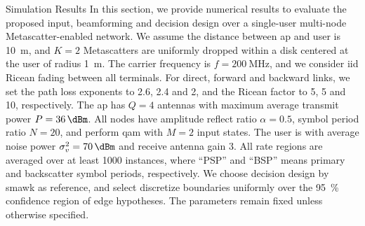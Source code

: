 \documentclass[journal]{IEEEtran}
\begin{document}
\begin{section}{Simulation Results}
	In this section, we provide numerical results to evaluate the proposed input, beamforming and decision design over a single-user multi-node Metascatter-enabled network.
	We assume the distance between \gls{ap} and user is \qty{10}{\meter}, and $K=2$ Metascatters are uniformly dropped within a disk centered at the user of radius \qty{1}{\meter}.
	The carrier frequency is $f=\qty{200}{\MHz}$, and we consider \gls{iid} Ricean fading between all terminals.
	For direct, forward and backward links, we set the path loss exponents to \num{2.6}, \num{2.4} and \num{2}, and the Ricean factor to \num{5}, \num{5} and \num{10}, respectively.
	The \gls{ap} has $Q=4$ antennas with maximum average transmit power $P=\qty{36}{\dBm}$.
	All nodes have amplitude reflect ratio $\alpha=0.5$, symbol period ratio $N=20$, and perform \gls{qam} with $M=2$ input states.
	The user is with average noise power $\sigma_v^2=\qty{70}{\dBm}$ and receive antenna gain \qty{3}{\dBi}.
	All rate regions are averaged over at least \num{1000} instances, where ``PSP'' and ``BSP'' means primary and backscatter symbol periods, respectively.
	We choose decision design by \gls{smawk} \cite{He2021} as reference, and select discretize boundaries uniformly over the \qty{95}{\percent} confidence region of edge hypotheses.
	The parameters remain fixed unless otherwise specified.


\end{section}
\end{document}
